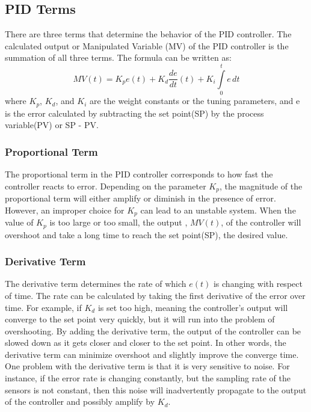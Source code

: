 \subsection{PID Terms}
There are three terms that determine the behavior of the
PID controller. The calculated output or Manipulated Variable (MV) of the PID
controller is the summation of all three terms. The formula can be written as:
\begin{displaymath}
MV(t) = K_pe(t) + K_d\frac{de}{dt}(t) + K_i\int\limits_{0}^{t} e\, dt
\end{displaymath}
where $K_p$, $K_d$, and $K_i$ are the weight constants or the tuning parameters,
and e is the error calculated by subtracting the set point(SP) by the process
variable(PV) or SP - PV.

\subsubsection{Proportional Term}
The proportional term in the PID controller corresponds to how fast the
controller reacts to error. Depending on the parameter $K_p$, the magnitude of
the proportional term will either amplify or diminish in the presence of error.
However, an improper choice for $K_p$ can lead to an unstable system.  When the value of $K_p$ is too large or too small, the output , $MV(t)$, of the controller will overshoot and take a long time to reach the set
point(SP), the desired value. 

\subsubsection{Derivative Term}
The derivative term determines the rate of which $e(t)$ is changing with
respect of time. The rate can be calculated by taking the first derivative of
the error over time. For example, if $K_d$ is set too high, meaning the
controller's output will converge to the set point very quickly, but it will run
into the problem of overshooting. By adding the derivative term, the output of
the controller can be slowed down as it gets closer and closer to the set point.
In other words, the derivative term can minimize overshoot and slightly improve
the converge time. One problem with the derivative term is that it is very
sensitive to noise. For instance, if the error rate is changing constantly, but
the sampling rate of the sensors is not constant, then this noise will
inadvertently propagate to the output of the controller and possibly amplify by
$K_d$. 


